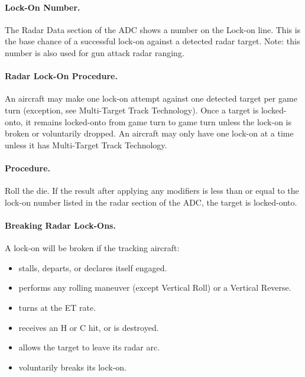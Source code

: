 \paragraph{Lock-On Number.} The Radar Data section of the ADC shows a number on the Lock-on line. This is the base chance of a successful lock-on against a detected radar target. Note: this number is also used for gun attack radar ranging.

\paragraph{Radar Lock-On Procedure.} An aircraft may make one lock-on attempt against one detected target per game turn (exception, see Multi-Target Track Technology). Once a target is locked-onto, it remains locked-onto from game turn to game turn unless the lock-on is broken or voluntarily dropped. An aircraft may only have one lock-on at a time unless it has Multi-Target Track Technology.

\paragraph{Procedure.} Roll the die. If the result after applying any modifiers is less than or equal to the lock-on number listed in the radar section of the ADC, the target is locked-onto. 

\paragraph{Breaking Radar Lock-Ons.} A lock-on will be broken if the tracking aircraft:

\begin{itemize}

    \item stalls, departs, or declares itself engaged.

    \item performs any rolling maneuver (except Vertical Roll) or a Vertical Reverse.

    \item turns at the ET rate.

    \item receives an H or C hit, or is destroyed.

    \item allows the target to leave its radar arc.

    \item voluntarily breaks its lock-on.

\end{itemize}

